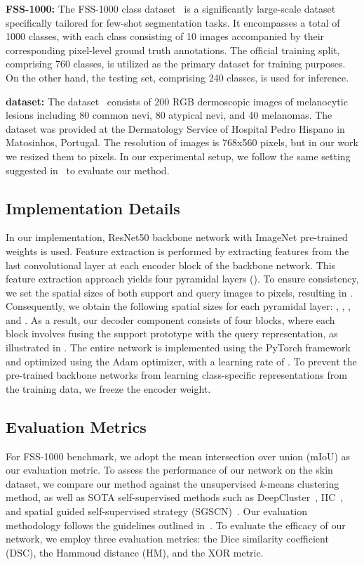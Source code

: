 \documentclass[runningheads]{llncs}
\begin{document}
\noindent \textbf{FSS-1000:} The FSS-1000 class dataset~\cite{li2020fss} is a significantly large-scale dataset specifically tailored for few-shot segmentation tasks. It encompasses a total of 1000 classes, with each class consisting of 10 images accompanied by their corresponding pixel-level ground truth annotations. The official training split, comprising 760 classes, is utilized as the primary dataset for training purposes. On the other hand, the testing set, comprising 240 classes, is used for inference.


\noindent\textbf{ dataset:} The  dataset~\cite{mendoncca2013ph} consists of 200 RGB dermoscopic images of melanocytic lesions including 80 common nevi, 80 atypical nevi, and 40 melanomas. The dataset was provided at the Dermatology Service of Hospital Pedro Hispano in Matosinhos, Portugal. The resolution of images is 768x560 pixels, but in our work we resized them to  pixels. 
In our experimental setup, we follow the same setting suggested in~\cite{feyjie2020semi} to evaluate our method.

\subsection{Implementation Details}
In our implementation, ResNet50 backbone network with ImageNet pre-trained weights is used. Feature extraction is performed by extracting features from the last convolutional layer at each encoder block of the backbone network. This feature extraction approach yields four pyramidal layers ().
To ensure consistency, we set the spatial sizes of both support and query images to  pixels, resulting in . Consequently, we obtain the following spatial sizes for each pyramidal layer: , , , and . As a result, our decoder component consists of four blocks, where each block involves fusing the support prototype with the query representation, as illustrated in . The entire network is implemented using the PyTorch framework and optimized using the Adam optimizer, with a learning rate of . To prevent the pre-trained backbone networks from learning class-specific representations from the training data, we freeze the encoder weight.

\subsection{Evaluation Metrics}
For FSS-1000 benchmark, we adopt the mean intersection over union (mIoU) as our evaluation metric.
To assess the performance of our network on the skin dataset, we compare our method against the unsupervised \textit{k}-means clustering method, as well as SOTA self-supervised methods such as DeepCluster~\cite{caron2018deep}, IIC~\cite{ji2019invariant}, and spatial guided self-supervised strategy (SGSCN)~\cite{ahn2021spatial}. Our evaluation methodology follows the guidelines outlined in~\cite{ahn2021spatial}.
To evaluate the efficacy of our network, we employ three evaluation metrics: the Dice similarity coefficient (DSC), the Hammoud distance (HM), and the XOR metric.
\end{document}
